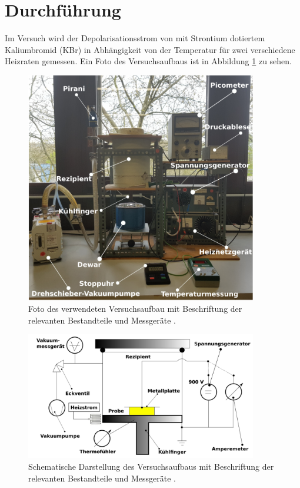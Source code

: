 \section{Durchführung}
\label{sec:Durchführung}

Im Versuch wird der Depolarisationsstrom von mit Strontium dotiertem Kaliumbromid (KBr) in Abhängigkeit
von der Temperatur für zwei verschiedene Heizraten gemessen. Ein Foto des Versuchsaufbaus ist in Abbildung \ref{fig:aufbauFoto} zu sehen.

\begin{figure}
  \centering
  \includegraphics[width=0.9\textwidth]{data/aufbauFoto.png}
  \caption{Foto des verwendeten Versuchsaufbau mit Beschriftung der relevanten Bestandteile und Messgeräte \cite{Versuchsanleitung}.}
  \label{fig:aufbauFoto}
\end{figure}

\begin{figure}
  \centering
  \includegraphics[width=0.9\textwidth]{data/aufbau.png}
  \caption{Schematische Darstellung des Versuchsaufbaus mit Beschriftung der relevanten Bestandteile und Messgeräte \cite{Versuchsanleitung}.}
  \label{fig:aufbau}
\end{figure}

